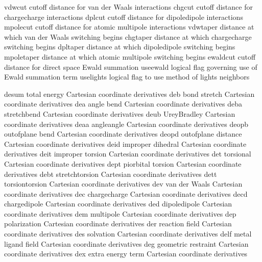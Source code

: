 \documentclass[letterpaper,11pt,english]{sphinxmanual}
\begin{document}

\begin{sphinxVerbatim}[commandchars=\\\{\}]
vdwcut          cutoff distance for van der Waals interactions
chgcut          cutoff distance for charge\PYGZhy{}charge interactions
dplcut          cutoff distance for dipole\PYGZhy{}dipole interactions
mpolecut        cutoff distance for atomic multipole interactions
vdwtaper        distance at which van der Waals switching begins
chgtaper        distance at which charge\PYGZhy{}charge switching begins
dpltaper        distance at which dipole\PYGZhy{}dipole switching begins
mpoletaper      distance at which atomic multipole switching begins
ewaldcut        cutoff distance for direct space Ewald summation
use\PYGZus{}ewald       logical flag governing use of Ewald summation term
use\PYGZus{}lights      logical flag to use method of lights neighbors
\end{sphinxVerbatim}


\begin{sphinxVerbatim}[commandchars=\\\{\}]
desum           total energy Cartesian coordinate derivatives
deb             bond stretch Cartesian coordinate derivatives
dea             angle bend Cartesian coordinate derivatives
deba            stretch\PYGZhy{}bend Cartesian coordinate derivatives
deub            Urey\PYGZhy{}Bradley Cartesian coordinate derivatives
deaa            angle\PYGZhy{}angle Cartesian coordinate derivatives
deopb           out\PYGZhy{}of\PYGZhy{}plane bend Cartesian coordinate derivatives
deopd           out\PYGZhy{}of\PYGZhy{}plane distance Cartesian coordinate derivatives
deid            improper dihedral Cartesian coordinate derivatives
deit            improper torsion Cartesian coordinate derivatives
det             torsional Cartesian coordinate derivatives
dept            pi\PYGZhy{}orbital torsion Cartesian coordinate derivatives
debt            stretch\PYGZhy{}torsion Cartesian coordinate derivatives
dett            torsion\PYGZhy{}torsion Cartesian coordinate derivatives
dev             van der Waals Cartesian coordinate derivatives
dec             charge\PYGZhy{}charge Cartesian coordinate derivatives
decd            charge\PYGZhy{}dipole Cartesian coordinate derivatives
ded             dipole\PYGZhy{}dipole Cartesian coordinate derivatives
dem             multipole Cartesian coordinate derivatives
dep             polarization Cartesian coordinate derivatives
der             reaction field Cartesian coordinate derivatives
des             solvation Cartesian coordinate derivatives
delf            metal ligand field Cartesian coordinate derivatives
deg             geometric restraint Cartesian coordinate derivatives
dex             extra energy term Cartesian coordinate derivatives
\end{sphinxVerbatim}
\end{document}
